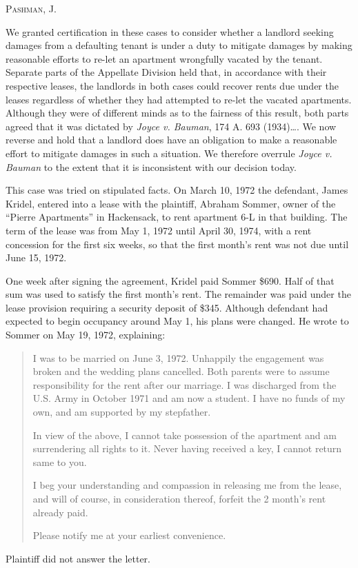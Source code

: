 

\opinion \textsc{Pashman}, J.

We granted certification in these cases to consider whether a landlord seeking
damages from a defaulting tenant is under a duty to mitigate damages by making
reasonable efforts to re-let an apartment wrongfully vacated by the tenant.
Separate parts of the Appellate Division held that, in accordance with their
respective leases, the landlords in both cases could recover rents due under
the leases regardless of whether they had attempted to re-let the vacated
apartments. Although they were of different minds as to the fairness of this
result, both parts agreed that it was dictated by \textit{Joyce v. Bauman}, 174
A. 693 (1934)\ldots.  We now reverse and hold that a landlord does have an
obligation to make a reasonable effort to mitigate damages in such a situation.
We therefore overrule \textit{Joyce v. Bauman} to the extent that it is
inconsistent with our decision today.


This case was tried on stipulated facts. On March 10, 1972 the defendant, James
Kridel, entered into a lease with the plaintiff, Abraham Sommer, owner of the
``Pierre Apartments'' in Hackensack, to rent apartment 6-L in that building.
The term of the lease was from May 1, 1972 until April 30, 1974, with a rent
concession for the first six weeks, so that the first month's rent was not due
until June 15, 1972.


One week after signing the agreement, Kridel paid Sommer \$690. Half of that sum
was used to satisfy the first month's rent. The remainder was paid under the
lease provision requiring a security deposit of \$345. Although defendant had
expected to begin occupancy around May 1, his plans were changed. He wrote to
Sommer on May 19, 1972, explaining:
\begin{quotation}
I was to be married on June 3, 1972. Unhappily the engagement was broken and the
wedding plans cancelled. Both parents were to assume responsibility for the
rent after our marriage. I was discharged from the U.S. Army in October 1971
and am now a student. I have no funds of my own, and am supported by my
stepfather.

In view of the above, I cannot take possession of the apartment and am
surrendering all rights to it. Never having received a key, I cannot return
same to you.

I beg your understanding and compassion in releasing me from the lease, and will
of course, in consideration thereof, forfeit the 2 month's rent already paid.

Please notify me at your earliest convenience.
\end{quotation}
Plaintiff did not answer the letter.

